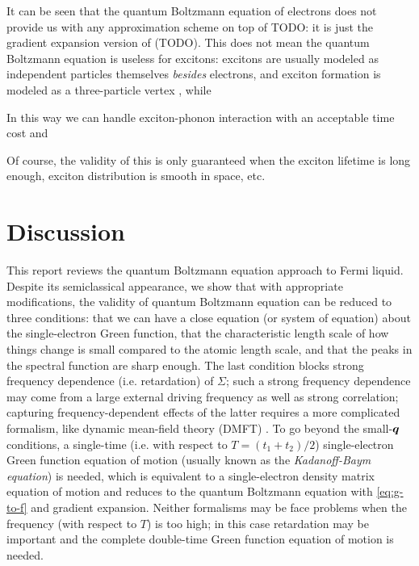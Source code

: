 \documentclass[hyperref, a4paper]{article}
\begin{document}
It can be seen that the quantum Boltzmann equation of electrons 
does not provide us with any approximation scheme on top of TODO:
it is just the gradient expansion version of (TODO).
This does not mean the quantum Boltzmann equation is useless for excitons:
excitons are usually modeled as independent particles themselves
\emph{besides} electrons,
and exciton formation is modeled as 
a three-particle vertex \cite{klimontovich1981quantum},
while 

In this way we can handle exciton-phonon interaction with an acceptable time cost 
and

Of course, the validity of this is only guaranteed 
when the exciton lifetime is long enough, 
exciton distribution is smooth in space, etc. 

\section{Discussion}

This report reviews the quantum Boltzmann equation approach to Fermi liquid.
Despite its semiclassical appearance, 
we show that with appropriate modifications,
the validity of quantum Boltzmann equation 
can be reduced to three conditions:
that we can have a close equation (or system of equation) about 
the single-electron Green function,
that the characteristic length scale of how things change is 
small compared to the atomic length scale, 
and that the peaks in the spectral function are sharp enough.
The last condition blocks strong frequency dependence (i.e. retardation) of $\Sigma$;
such a strong frequency dependence may come from 
a large external driving frequency as well as strong correlation;
capturing frequency-dependent effects of the latter requires 
a more complicated formalism, 
like dynamic mean-field theory (DMFT) \cite{georges1996dynamical}.
To go beyond the small-$\vb*{q}$ conditions,
a single-time (i.e. with respect to $T = (t_1 + t_2) / 2$)
single-electron Green function equation of motion
(usually known as the \emph{Kadanoff-Baym equation}) is needed,
which is equivalent to a single-electron density matrix equation of motion
\cite{attaccalite2011real}
and reduces to the quantum Boltzmann equation with \eqref{eq:g-to-f} 
and gradient expansion.
Neither formalisms may be face problems when the frequency 
(with respect to $T$) is too high;
in this case retardation may be important 
and the complete double-time Green function equation of motion is needed.
\end{document}
